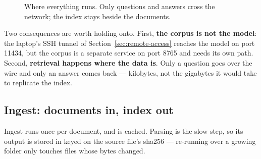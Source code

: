 \begin{figure}[!ht]
{}
  \caption{Where everything runs. Only questions and answers cross the network;
           the index stays beside the documents.}
  \label{fig:corpus-system}
\end{figure}

Two consequences are worth holding onto. First, \textbf{the corpus is not the
model}: the laptop's SSH tunnel of Section~\ref{sec:remote-access} reaches the
model on port 11434, but the corpus is a separate service on port 8765 and
needs its own path. Second, \textbf{retrieval happens where the data is}. Only
a question goes over the wire and only an answer comes back --- kilobytes, not
the gigabytes it would take to replicate the index.

\subsection{Ingest: documents in, index out}
Ingest runs once per document, and is cached. Parsing is the slow step, so its
output is stored in  keyed on the source file's sha256 --- re-running
 over a growing folder only touches files whose bytes
changed.

